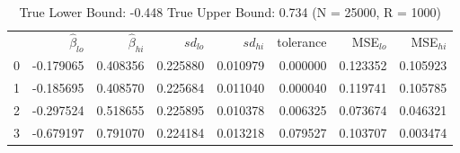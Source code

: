 \begin{table}
\caption{True Lower Bound: -0.448 True Upper Bound: 0.734 (N = 25000, R = 1000)}
\begin{tabular}{lrrrrrrr}
 & $\hat{\beta}_{lo}$ & $\hat{\beta}_{hi}$ & $sd_{lo}$ & $sd_{hi}$ & tolerance & MSE$_{lo}$ & MSE$_{hi}$ \\
0 & -0.179065 & 0.408356 & 0.225880 & 0.010979 & 0.000000 & 0.123352 & 0.105923 \\
1 & -0.185695 & 0.408570 & 0.225684 & 0.011040 & 0.000040 & 0.119741 & 0.105785 \\
2 & -0.297524 & 0.518655 & 0.225895 & 0.010378 & 0.006325 & 0.073674 & 0.046321 \\
3 & -0.679197 & 0.791070 & 0.224184 & 0.013218 & 0.079527 & 0.103707 & 0.003474 \\
\end{tabular}
\end{table}
